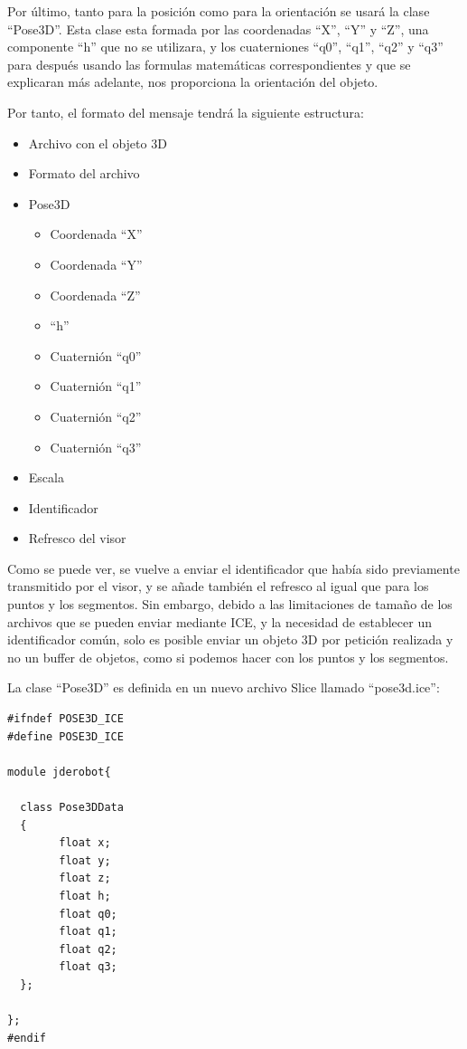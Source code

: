 Por último, tanto para la posición como para la orientación se usará la clase ``Pose3D''. Esta clase esta formada por las coordenadas ``X'', ``Y'' y ``Z'', una componente ``h'' que no se utilizara, y los cuaterniones ``q0'', ``q1'', ``q2'' y ``q3'' para después usando las formulas matemáticas correspondientes y que se explicaran más adelante, nos proporciona la orientación del objeto.

Por tanto, el formato del mensaje tendrá la siguiente estructura:
\begin{itemize}
	\item Archivo con el objeto 3D
	\item Formato del archivo
	\item	Pose3D
	\begin{itemize}
		\item Coordenada ``X''
		\item Coordenada ``Y''
		\item Coordenada ``Z''
		\item ``h''
		\item Cuaternión ``q0''
		\item Cuaternión ``q1''
		\item Cuaternión ``q2''
		\item Cuaternión ``q3''
	\end{itemize}
	\item Escala
	\item Identificador
	\item Refresco del visor
\end{itemize}
Como se puede ver, se vuelve a enviar el identificador que había sido previamente transmitido por el visor, y se añade también el refresco al igual que para los puntos y los segmentos. Sin embargo, debido a las limitaciones de tamaño de los archivos que se pueden enviar mediante ICE, y la necesidad de establecer un identificador común, solo es posible enviar un objeto 3D por petición realizada y no un buffer de objetos, como si podemos hacer con los puntos y los segmentos.

La clase ``Pose3D'' es definida en un nuevo archivo Slice llamado ``pose3d.ice'':

\begin{lstlisting}[frame=single]
#ifndef POSE3D_ICE
#define POSE3D_ICE

module jderobot{

  class Pose3DData
  {
		float x;
		float y;
		float z;
  		float h;
		float q0;
		float q1;
		float q2;
		float q3;
  };

}; 
#endif
\end{lstlisting}

